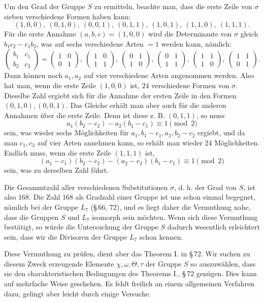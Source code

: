 \documentclass[11pt]{article}
\providecommand{\mat}[4]{\begin{pmatrix}#1&#2\\#3&#4\end{pmatrix}}
\providecommand{\mat}[4]{\begin{pmatrix}#1&#2\\#3&#4\end{pmatrix}}
\begin{document}
Um den Grad der Gruppe $S$ zu ermitteln, beachte man, dass die erste Zeile von $\sigma$ sieben verschiedene Formen haben kann:
\[
 (1,0,0),\ (0,1,0),\ (0,0,1),\ (0,1,1),\ (1,0,1),\ (1,1,0),\ (1,1,1).
\]
Für die erste Annahme $(a,b,c)=(1,0,0)$ wird die Determinante von $\sigma$ gleich $b_1c_2-c_1b_2$, was auf sechs verschiedene Arten $=1$ werden kann, nämlich:
\[
 \mat{b_1}{c_1}{b_2}{c_2}=\mat{1}{0}{0}{1},\ \mat{1}{0}{1}{1},\ \mat{0}{1}{1}{0},\ \mat{0}{1}{1}{1},\ \mat{1}{1}{1}{0},\ \mat{1}{1}{0}{1}.
\]
Dann können noch $a_1,a_2$ auf vier verschiedene Arten angenommen werden. Also hat man, wenn die erste Zeile $(1,0,0)$ ist, $24$ verschiedene Formen von $\sigma$. Dieselbe Zahl ergiebt sich für die Annahme der ersten Zeile in den Formen $(0,1,0),(0,0,1)$. Das Gleiche erhält man aber auch für die anderen Annahmen über die erste Zeile. Denn ist diese z. B. $(0,1,1)$, so muss
\[
 a_1(b_2-c_2)-a_2(b_1-c_1)\equiv 1\pmod 2
\]
sein, was wieder sechs Möglichkeiten für $a_1,b_1-c_1,a_2,b_2-c_2$ ergiebt, und da man $c_1,c_2$ auf vier Arten annehmen kann, so erhält man wieder $24$ Möglichkeiten. Endlich muss, wenn die erste Zeile $(1,1,1)$ ist,
\[
 (a_1-c_1)(b_2-c_2)-(a_2-c_2)(b_1-c_1)\equiv 1\pmod 2
\]
sein, was zu derselben Zahl führt.

Die Gesammtzahl aller verschiedenen Substitutionen $\sigma$, d. h. der Grad von $S$, ist also $168$. Die Zahl $168$ als Gradzahl einer Gruppe ist uns schon einmal begegnet, nämlich bei der Gruppe $L_7$ (\S\,66, 72), und es liegt daher die Vermuthung nahe, dass die Gruppen $S$ und $L_7$ isomorph sein möchten. Wenn sich diese Vermuthung bestätigt, so würde die Untersuchung der Gruppe $S$ dadurch wesentlich erleichtert sein, dass wir die Divisoren der Gruppe $L_7$ schon kennen.

Diese Vermuthung zu prüfen, dient aber das Theorem I. in \S\,72. Wir suchen zu diesem Zweck erzeugende Elemente $\chi,\omega,\Theta,\tau$ der Gruppe $S$ so auszuwählen, dass sie den charakteristischen Bedingungen des Theorems I., \S\,72 genügen. Dies kann auf mehrfache Weise geschehen. Es fehlt freilich an einem allgemeinen Verfahren dazu, gelingt aber leicht durch einige Versuche.
\end{document}

